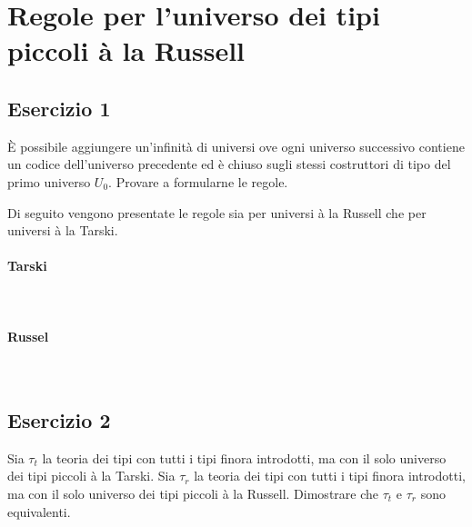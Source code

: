 \section{Regole per l’universo dei tipi piccoli à la Russell}
\subsection{Esercizio 1}
\begin{thm} 
	\`E possibile aggiungere un'infinità di universi ove ogni universo successivo contiene un codice dell'universo precedente ed è chiuso sugli stessi costruttori di tipo del primo universo $U_0$. Provare a formularne le regole.
\end{thm}
Di seguito vengono presentate le regole sia per universi à la Russell che per universi à la Tarski.

\paragraph{Tarski} \mbox{} \\


\paragraph{Russel} \mbox{} \\


\subsection{Esercizio 2}
\begin{thm}
	Sia $\tau_t$ la teoria dei tipi con tutti i tipi finora introdotti, ma con il solo universo dei tipi piccoli à la Tarski. Sia $\tau_r$ la teoria dei tipi con tutti i tipi finora introdotti, ma con il solo universo dei tipi piccoli à la Russell. Dimostrare che $\tau_t$ e $\tau_r$ sono equivalenti.
\end{thm}

